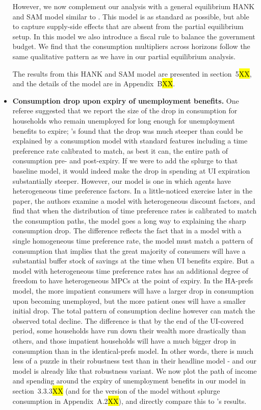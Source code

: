 \begin{itemize}
	However, we now complement our analysis with a general equilibrium HANK and SAM model similar to \citet{Ravn2017}. This model is as standard as possible, but able to capture supply-side effects that are absent from the partial equilibrium setup. In this model we also introduce a fiscal rule to balance the government budget. We find that the consumption multipliers across horizons follow the same qualitative pattern as we have in our partial equilibrium analysis.
	
	The results from this HANK and SAM model are presented in section~5\hl{XX}, and the details of the model are in Appendix~B\hl{XX}.
	
      \item \textbf{Consumption drop upon expiry of unemployment benefits.} One referee suggested that we report the size of the drop in consumption for households who remain unemployed for long enough for unemployment benefits to expire; \citeauthor{ganongConsumer2019}'s found that the drop was much steeper than could be explained by a consumption model with standard features including a time preference rate calibrated to match, as best it can, the entire path of consumption pre- and post-expiry.  If we were to add the splurge to that baseline model, it would indeed make the drop in spending at UI expiration substantially steeper. However, our model is one in which agents have heterogeneous time preference factors.  In a little-noticed exercise later in the \citeauthor{ganongConsumer2019} paper, the authors examine a model with heterogeneous discount factors, and find that when the distribution of time preference rates is calibrated to match the consumption paths, the model goes a long way to explaining the sharp consumption drop.  The difference reflects the fact that in a model with a single homogeneous time preference rate, the model must match a pattern of consumption that implies that the great majority of consumers will have a substantial buffer stock of savings at the time when UI benefits expire.  But a model with heterogeneous time preference rates has an additional degree of freedom to have heterogeneous MPCs at the point of expiry.  In the HA-prefs model, the more impatient consumers will have a larger drop in consumption upon becoming unemployed, but the more patient ones will have a smaller initial drop. The total pattern of consumption decline however can match the observed total decline.  The difference is that by the end of the UI-covered period, some households have run down their wealth more drastically than others, and those impatient households will have a much bigger drop in consumption than in the identical-prefs model.  In other words, there is much less of a puzzle in their robustness test than in their headline model - and our model is already like that robustness variant.
        We now plot the path of income and spending around the expiry of unemployment benefits in our model in section~3.3.3\hl{XX} (and for the version of the model without splurge consumption in Appendix~A.2\hl{XX}), and directly compare this to \citeauthor{ganongConsumer2019}'s results.
	
	
\end{itemize}
